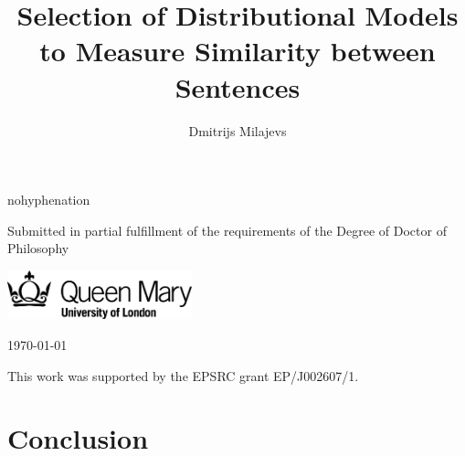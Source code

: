 \documentclass[11pt,a4paper,english,oneside]{book}
\title{Selection of Distributional Models to Measure Similarity between Sentences}
\author{Dmitrijs Milajevs}
\begin{document}
\begin{titlepage}
  \headingfont
    \vspace*{1cm}

    \begin{hyphenrules}{nohyphenation}
      {\Large \thetitle}
    \end{hyphenrules}

    \vspace{1.5cm}

    {\large \theauthor}

    \vfill


    \vspace{0.8cm}

    \begin{center}
     Submitted in partial fulfillment of the requirements of the Degree of Doctor of Philosophy

     \vspace{0.8cm}

     \includegraphics[width=0.4\textwidth]{qmlogo}
      
      \vspace{0.8cm}
      \today
    \end{center}
\end{titlepage}
\addtocounter{page}{1}


\cleardoublepage

\vspace*{\fill}
\begin{center}
  This work was supported by the EPSRC grant EP/J002607/1.
\end{center}
\vfill
\thispagestyle{plain}
\cleardoublepage


\thispagestyle{plain}
\cleardoublepage

{
  \pagestyle{plain}
  \tableofcontents
  \cleardoublepage
  \listoffigures
  \cleardoublepage
  \listoftables
  \thispagestyle{plain}
}








\chapter{Conclusion}
\end{document}

